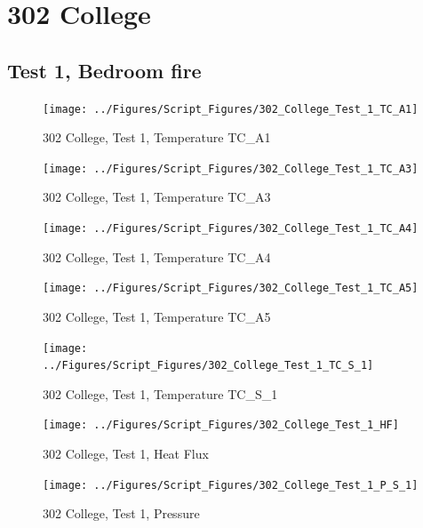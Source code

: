 \documentclass[12pt,oneside]{book}
\begin{document}
\clearpage


\section{302 College}

\subsection{Test 1, Bedroom fire}



\begin{figure}[!ht]
\texttt{[image: ../Figures/Script\_Figures/302\_College\_Test\_1\_TC\_A1]}
\caption{302 College, Test 1, Temperature TC\_A1}
\label{fig:302_College_Test_1_TC_A1}
\end{figure}

\begin{figure}[!ht]
\texttt{[image: ../Figures/Script\_Figures/302\_College\_Test\_1\_TC\_A3]}
\caption{302 College, Test 1, Temperature TC\_A3}
\label{fig:302_College_Test_1_TC_A3}
\end{figure}

\begin{figure}[!ht]
\texttt{[image: ../Figures/Script\_Figures/302\_College\_Test\_1\_TC\_A4]}
\caption{302 College, Test 1, Temperature TC\_A4}
\label{fig:302_College_Test_1_TC_A4}
\end{figure}

\begin{figure}[!ht]
\texttt{[image: ../Figures/Script\_Figures/302\_College\_Test\_1\_TC\_A5]}
\caption{302 College, Test 1, Temperature TC\_A5}
\label{fig:302_College_Test_1_TC_A5}
\end{figure}

\begin{figure}[!ht]
\texttt{[image: ../Figures/Script\_Figures/302\_College\_Test\_1\_TC\_S\_1]}
\caption{302 College, Test 1, Temperature TC\_S\_1}
\label{fig:302_College_Test_1_TC_S_1}
\end{figure}

\begin{figure}[!ht]
\texttt{[image: ../Figures/Script\_Figures/302\_College\_Test\_1\_HF]}
\caption{302 College, Test 1, Heat Flux}
\label{fig:302_College_Test_1_HF}
\end{figure}

\begin{figure}[!ht]
\texttt{[image: ../Figures/Script\_Figures/302\_College\_Test\_1\_P\_S\_1]}
\caption{302 College, Test 1, Pressure}
\label{fig:302_College_Test_1_P_S_1}
\end{figure}
\end{document}
